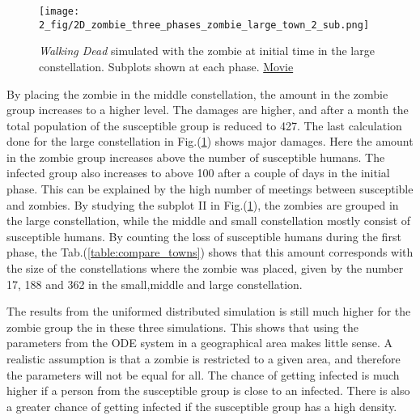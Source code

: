 \documentclass[%
twoside,                 %
final,                   %
chapterprefix=true,      %
open=right               %
10pt]{book}
\begin{document}
\begin{figure}[ht]
  \centerline{\texttt{[image: 2\_fig/2D\_zombie\_three\_phases\_zombie\_large\_town\_2\_sub.png]}}
  \caption{
  \label{fig:large_town} \emph{Walking Dead} simulated with the zombie at initial time in the large constellation. Subplots shown at each phase. \href{{https://torbjornseland.github.io/master}}{Movie}
  }
\end{figure}


By placing the zombie in the middle constellation, the amount in the zombie group increases to a higher level. The damages are higher, and after a month the total population of the susceptible group is reduced to 427. The last calculation done for the large constellation in Fig.(\ref{fig:large_town}) shows major damages. Here the amount in the zombie group increases above the number of susceptible humans. The infected group also increases to above 100 after a couple of days in the initial phase. This can be explained by the high number of meetings between susceptible and zombies. By studying the subplot II in Fig.(\ref{fig:large_town}), the zombies are grouped in the large constellation, while the middle and small constellation mostly consist of susceptible humans. By counting the loss of susceptible humans during the first phase, the Tab.(\ref{table:compare_towns}) shows that this amount corresponds with the size of the constellations where the zombie was placed, given by the number 17, 188 and 362 in the small,middle and large constellation. 


\vspace{3mm}




\vspace{3mm}


The results from the uniformed distributed simulation is still much higher for the zombie group the in these three simulations. This shows that using the parameters from the ODE system in a geographical area makes little sense. A realistic assumption is that a zombie is restricted to a given area, and therefore the parameters will not be equal for all. The chance of getting infected is much higher if a person from the susceptible group is close to an infected. There is also a greater chance of getting infected if the susceptible group has a high density. 

\end{document}
